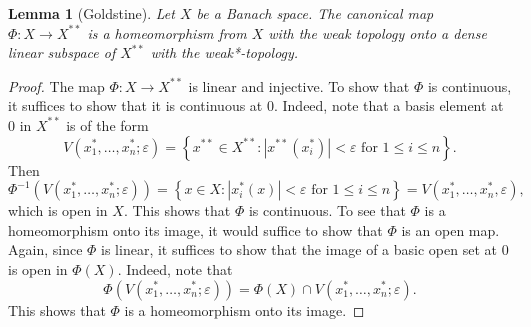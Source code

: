 \documentclass[11pt]{article}
\theoremstyle{thmstyle}
\newtheorem{lemma}[theorem]{Lemma}
\theoremstyle{defstyle}
\renewcommand{\le}{\leqslant}
\begin{document}
\begin{lemma}[Goldstine]
    Let $X$ be a Banach space. The canonical map $\Phi\colon X\to X^{\ast\ast}$ is a homeomorphism from $X$ with the weak topology onto a dense linear subspace of $X^{\ast\ast}$ with the weak*-topology.
\end{lemma}
\begin{proof}
    The map $\Phi\colon X\to X^{\ast\ast}$ is linear and injective. To show that $\Phi$ is continuous, it suffices to show that it is continuous at $0$. Indeed, note that a basis element at $0$ in $X^{\ast\ast}$ is of the form 
    \begin{equation*}
        V\left(x_1^\ast, \dots, x_n^\ast; \varepsilon\right) = \left\{x^{\ast\ast}\in X^{\ast\ast}\colon \left|x^{\ast\ast}(x_i^\ast)\right| < \varepsilon\text{ for }1\le i\le n\right\}.
    \end{equation*}
    Then 
    \begin{equation*}
        \Phi^{-1}\left(V\left(x_1^\ast,\dots,x_n^\ast; \varepsilon\right)\right) = \left\{x\in X\colon \left|x_i^{\ast}(x)\right| < \varepsilon\text{ for }1\le i\le n\right\} = V\left(x_1^\ast, \dots, x_n^\ast, \varepsilon\right),
    \end{equation*}
    which is open in $X$. This shows that $\Phi$ is continuous. To see that $\Phi$ is a homeomorphism onto its image, it would suffice to show that $\Phi$ is an open map. Again, since $\Phi$ is linear, it suffices to show that the image of a basic open set at $0$ is open in $\Phi(X)$. Indeed, note that 
    \begin{equation*}
        \Phi\left(V\left(x_1^\ast,\dots,x_n^\ast; \varepsilon\right)\right) = \Phi(X)\cap V\left(x_1^\ast,\dots, x_n^\ast; \varepsilon\right).
    \end{equation*}
    This shows that $\Phi$ is a homeomorphism onto its image.


\end{proof}
\end{document}
